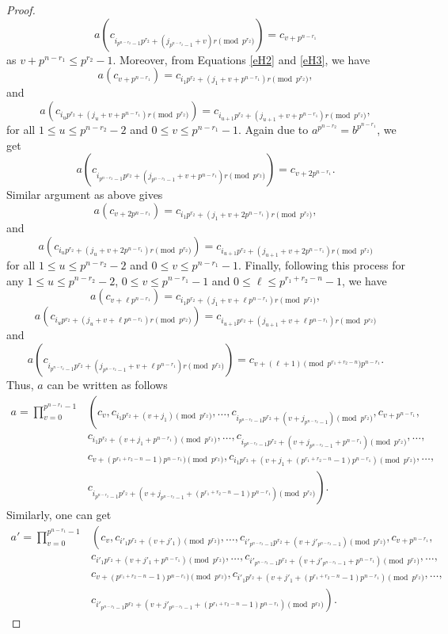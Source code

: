 \documentclass[11pt]{amsart}
\theoremstyle{plain}
\numberwithin{equation}{section}
\begin{document}
\begin{proof}
 $$a\left(c_{i_{p^{n-r_2}-1}p^{r_2}+(j_{p^{n-r_2}-1}+v)r \pmod{p^{r_2}}}\right)=c_{v+p^{n-r_1}}$$ as $v+p^{n-r_1} \le p^{r_2}-1$. Moreover, from Equations \eqref{eH2} and \eqref{eH3}, we have  
  \[
 a(c_{v+p^{n-r_1}})=c_{i_{1}p^{r_2}+(j_{1}+v+p^{n-r_1})r \pmod{p^{r_2}}},
 \]
 and 
 \[
 a\left(c_{i_up^{r_2}+(j_u+v+p^{n-r_1})r \pmod{p^{r_2}}}\right)=c_{i_{u+1}p^{r_2}+(j_{u+1}+v+p^{n-r_1})r \pmod{p^{r_2}}},
 \]
for all $1 \le u \le p^{n-r_2}-2$ and $0 \le v \le p^{n-r_1}-1$. Again due to $a^{p^{n-r_2}}=b^{p^{n-r_1}}$, we get  $$a\left(c_{i_{p^{n-r_2}-1}p^{r_2}+(j_{p^{n-r_2}-1}+v+p^{n-r_1})r \pmod{p^{r_2}}}\right)=c_{v+2p^{n-r_1}}.$$ Similar argument as above gives 
\[
 a(c_{v+2p^{n-r_1}})=c_{i_{1}p^{r_2}+(j_{1}+v+2p^{n-r_1})r \pmod{p^{r_2}}},
 \]
and 
 \[
 a\left(c_{i_up^{r_2}+(j_u+v+2p^{n-r_1})r \pmod{p^{r_2}}}\right)=c_{i_{u+1}p^{r_2}+(j_{u+1}+v+2p^{n-r_1})r \pmod{p^{r_2}}}
 \]
 for all $1 \le u \le p^{n-r_2}-2$ and $0 \le v \le p^{n-r_1}-1$. Finally, following this process for any $1 \le u \le p^{n-r_2}-2$, $0 \le v \le p^{n-r_1}-1$ and $0 \le \ell \le p^{r_1+r_2-n}-1$, we have 
 \[
 a(c_{v+\ell p^{n-r_1}})=c_{i_{1}p^{r_2}+(j_{1}+v+\ell p^{n-r_1})r \pmod{p^{r_2}}},
 \]
  \[
 a\left(c_{i_up^{r_2}+(j_u+v+\ell p^{n-r_1})r \pmod{p^{r_2}}}\right)=c_{i_{u+1}p^{r_2}+(j_{u+1}+v+\ell p^{n-r_1})r \pmod{p^{r_2}}}
 \]
 and 
  $$a\left(c_{i_{p^{n-r_2}-1}p^{r_2}+(j_{p^{n-r_2}-1}+v+\ell p^{n-r_1})r \pmod{p^{r_2}}}\right)=c_{v+(\ell +1)\pmod {p^{r_1+r_2-n}}p^{n-r_1}}.$$ Thus, $a$ can be written as follows 
  \begin{equation*}
  \begin{split}
  a=\displaystyle \prod_{v=0}^{p^{n-r_1}-1}&\left(c_{v},c_{i_1p^{r_2}+(v+j_1)\pmod{p^{r_2}}},\ldots,c_{i_{p^{n-r_2}-1}p^{r_2}+(v+j_{p^{n-r_2}-1})\pmod{p^{r_2}}},c_{v+p^{n-r_1}},\right.\\&c_{i_1p^{r_2}+(v+j_1+p^{n-r_1})\pmod{p^{r_2}}},\ldots,c_{i_{p^{n-r_2}-1}p^{r_2}+(v+j_{p^{n-r_2}-1}+p^{n-r_1})\pmod{p^{r_2}}},\ldots,\\&c_{v+(p^{r_1+r_2-n}-1)p^{n-r_1})\pmod{p^{r_2}}},c_{i_1p^{r_2}+(v+j_1+(p^{r_1+r_2-n}-1)p^{n-r_1})\pmod{p^{r_2}}},\ldots,\\&\left. c_{i_{p^{n-r_2}-1}p^{r_2}+(v+j_{p^{n-r_2}-1}+(p^{r_1+r_2-n}-1)p^{n-r_1})\pmod{p^{r_2}}}\right).
  \end{split}
  \end{equation*}
  Similarly, one can get 
    \begin{equation*}
  \begin{split}
  a'=\displaystyle \prod_{v=0}^{p^{n-r_1}-1}&\left(c_{v},c_{i'_1p^{r_2}+(v+j'_1)\pmod{p^{r_2}}},\ldots,c_{i'_{p^{n-r_2}-1}p^{r_2}+(v+j'_{p^{n-r_2}-1})\pmod{p^{r_2}}},c_{v+p^{n-r_1}},\right. \\&c_{i'_1p^{r_2}+(v+j'_1+p^{n-r_1})\pmod{p^{r_2}}},\ldots,c_{i'_{p^{n-r_2}-1}p^{r_2}+(v+j'_{p^{n-r_2}-1}+p^{n-r_1})\pmod{p^{r_2}}},\ldots,\\&c_{v+(p^{r_1+r_2-n}-1)p^{n-r_1})\pmod{p^{r_2}}},c_{i'_1p^{r_2}+(v+j'_1+(p^{r_1+r_2-n}-1)p^{n-r_1})\pmod{p^{r_2}}},\ldots,\\&\left. c_{i'_{p^{n-r_2}-1}p^{r_2}+(v+j'_{p^{n-r_2}-1}+(p^{r_1+r_2-n}-1)p^{n-r_1})\pmod{p^{r_2}}}\right).

\end{split}
\end{equation*}
\end{proof}
\end{document}
